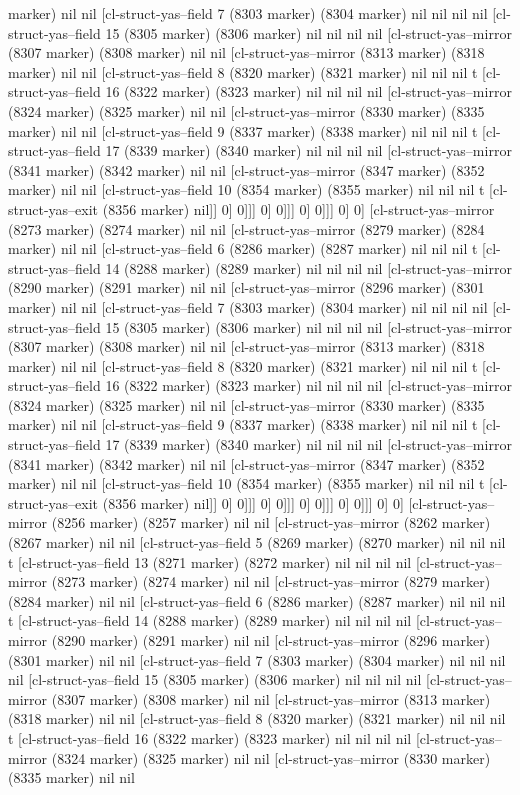 {{marker) nil nil [cl-struct-yas--field 7 (8303 marker) (8304 marker) nil nil nil nil [cl-struct-yas--field 15 (8305 marker) (8306 marker) nil nil nil nil [cl-struct-yas--mirror (8307 marker) (8308 marker) nil nil [cl-struct-yas--mirror (8313 marker) (8318 marker) nil nil [cl-struct-yas--field 8 (8320 marker) (8321 marker) nil nil nil t [cl-struct-yas--field 16 (8322 marker) (8323 marker) nil nil nil nil [cl-struct-yas--mirror (8324 marker) (8325 marker) nil nil [cl-struct-yas--mirror (8330 marker) (8335 marker) nil nil [cl-struct-yas--field 9 (8337 marker) (8338 marker) nil nil nil t [cl-struct-yas--field 17 (8339 marker) (8340 marker) nil nil nil nil [cl-struct-yas--mirror (8341 marker) (8342 marker) nil nil [cl-struct-yas--mirror (8347 marker) (8352 marker) nil nil [cl-struct-yas--field 10 (8354 marker) (8355 marker) nil nil nil t [cl-struct-yas--exit (8356 marker) nil]] 0] 0]]] 0] 0]]] 0] 0]]] 0] 0] [cl-struct-yas--mirror (8273 marker) (8274 marker) nil nil [cl-struct-yas--mirror (8279 marker) (8284 marker) nil nil [cl-struct-yas--field 6 (8286 marker) (8287 marker) nil nil nil t [cl-struct-yas--field 14 (8288 marker) (8289 marker) nil nil nil nil [cl-struct-yas--mirror (8290 marker) (8291 marker) nil nil [cl-struct-yas--mirror (8296 marker) (8301 marker) nil nil [cl-struct-yas--field 7 (8303 marker) (8304 marker) nil nil nil nil [cl-struct-yas--field 15 (8305 marker) (8306 marker) nil nil nil nil [cl-struct-yas--mirror (8307 marker) (8308 marker) nil nil [cl-struct-yas--mirror (8313 marker) (8318 marker) nil nil [cl-struct-yas--field 8 (8320 marker) (8321 marker) nil nil nil t [cl-struct-yas--field 16 (8322 marker) (8323 marker) nil nil nil nil [cl-struct-yas--mirror (8324 marker) (8325 marker) nil nil [cl-struct-yas--mirror (8330 marker) (8335 marker) nil nil [cl-struct-yas--field 9 (8337 marker) (8338 marker) nil nil nil t [cl-struct-yas--field 17 (8339 marker) (8340 marker) nil nil nil nil [cl-struct-yas--mirror (8341 marker) (8342 marker) nil nil [cl-struct-yas--mirror (8347 marker) (8352 marker) nil nil [cl-struct-yas--field 10 (8354 marker) (8355 marker) nil nil nil t [cl-struct-yas--exit (8356 marker) nil]] 0] 0]]] 0] 0]]] 0] 0]]] 0] 0]]] 0] 0] [cl-struct-yas--mirror (8256 marker) (8257 marker) nil nil [cl-struct-yas--mirror (8262 marker) (8267 marker) nil nil [cl-struct-yas--field 5 (8269 marker) (8270 marker) nil nil nil t [cl-struct-yas--field 13 (8271 marker) (8272 marker) nil nil nil nil [cl-struct-yas--mirror (8273 marker) (8274 marker) nil nil [cl-struct-yas--mirror (8279 marker) (8284 marker) nil nil [cl-struct-yas--field 6 (8286 marker) (8287 marker) nil nil nil t [cl-struct-yas--field 14 (8288 marker) (8289 marker) nil nil nil nil [cl-struct-yas--mirror (8290 marker) (8291 marker) nil nil [cl-struct-yas--mirror (8296 marker) (8301 marker) nil nil [cl-struct-yas--field 7 (8303 marker) (8304 marker) nil nil nil nil [cl-struct-yas--field 15 (8305 marker) (8306 marker) nil nil nil nil [cl-struct-yas--mirror (8307 marker) (8308 marker) nil nil [cl-struct-yas--mirror (8313 marker) (8318 marker) nil nil [cl-struct-yas--field 8 (8320 marker) (8321 marker) nil nil nil t [cl-struct-yas--field 16 (8322 marker) (8323 marker) nil nil nil nil [cl-struct-yas--mirror (8324 marker) (8325 marker) nil nil [cl-struct-yas--mirror (8330 marker) (8335 marker) nil nil }}
